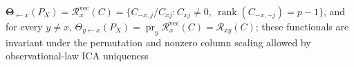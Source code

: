 \(\boldsymbol\Theta_{\leftarrow x}(P_X)=\mathcal R_x^{\mathrm{vec}}(C)=\{C_{-x,j}/C_{xj}:C_{xj}\ne0,\ \operatorname{rank}(C_{-x,-j})=p-1\}\), and for every \(y\ne x\), \(\Theta_{y\leftarrow x}(P_X)=\operatorname{pr}_y\mathcal R_x^{\mathrm{vec}}(C)=\mathcal R_{xy}(C)\); these functionals are invariant under the permutation and nonzero column scaling allowed by observational-law ICA uniqueness